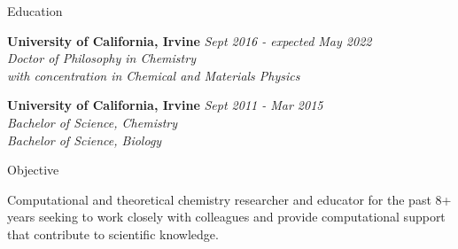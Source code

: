 \documentclass{resume} %
\begin{document}
{\centerline { } }

\begin{rSection}{Education}

{\bf University of California, Irvine} \hfill {\em Sept 2016 - expected May 2022} 
\\{\textit{Doctor of Philosophy in Chemistry \\
    with concentration in Chemical and Materials Physics}}

{\bf University of California, Irvine} \hfill {\em Sept 2011 - Mar 2015} 
\\ { \textit{Bachelor of Science, Chemistry}} \hfill
\\ { \textit{Bachelor of Science, Biology}} \hfill


\end{rSection}

\begin{rSection}{Objective}
  
  Computational and theoretical chemistry researcher and educator for the past 8+ years
  seeking to work closely with colleagues and provide computational support that contribute
  to scientific knowledge. 

\end{rSection}
\end{document}
